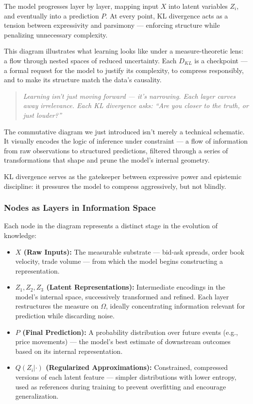 The model progresses layer by layer, mapping input \( X \) into latent variables \( Z_i \), and eventually into a prediction \( P \). At every point, KL divergence acts as a tension between expressivity and parsimony — enforcing structure while penalizing unnecessary complexity.



\vspace{1em}
This diagram illustrates what learning looks like under a measure-theoretic lens: a flow through nested spaces of reduced uncertainty. Each \( D_{KL} \) is a checkpoint — a formal request for the model to justify its complexity, to compress responsibly, and to make its structure match the data’s causality.

\begin{quote}
\textit{Learning isn’t just moving forward — it’s narrowing. Each layer carves away irrelevance. Each KL divergence asks: “Are you closer to the truth, or just louder?”}
\end{quote}

The commutative diagram we just introduced isn’t merely a technical schematic. It visually encodes the logic of inference under constraint — a flow of information from raw observations to structured predictions, filtered through a series of transformations that shape and prune the model’s internal geometry.

KL divergence serves as the gatekeeper between expressive power and epistemic discipline: it pressures the model to compress aggressively, but not blindly.

\subsubsection{Nodes as Layers in Information Space}

Each node in the diagram represents a distinct stage in the evolution of knowledge:

\begin{itemize}
    \item \textbf{\( X \) (Raw Inputs):} The measurable substrate — bid-ask spreads, order book velocity, trade volume — from which the model begins constructing a representation.
    
    \item \textbf{\( Z_1, Z_2, Z_3 \) (Latent Representations):} Intermediate encodings in the model's internal space, successively transformed and refined. Each layer restructures the measure on \( \Omega \), ideally concentrating information relevant for prediction while discarding noise.
    
    \item \textbf{\( P \) (Final Prediction):} A probability distribution over future events (e.g., price movements) — the model’s best estimate of downstream outcomes based on its internal representation.
    
    \item \textbf{\( Q(Z_i | \cdot) \) (Regularized Approximations):} Constrained, compressed versions of each latent feature — simpler distributions with lower entropy, used as references during training to prevent overfitting and encourage generalization.
\end{itemize}


